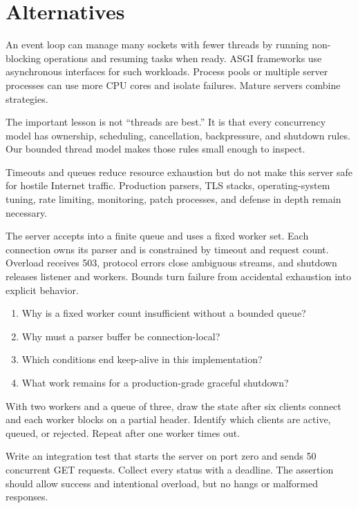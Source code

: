 \section{Alternatives}

An event loop can manage many sockets with fewer threads by running non-blocking
operations and resuming tasks when ready. ASGI frameworks use asynchronous
interfaces for such workloads. Process pools or multiple server processes can
use more CPU cores and isolate failures. Mature servers combine strategies.

The important lesson is not ``threads are best.'' It is that every concurrency
model has ownership, scheduling, cancellation, backpressure, and shutdown rules.
Our bounded thread model makes those rules small enough to inspect.

\begin{securityboundary}
Timeouts and queues reduce resource exhaustion but do not make this server safe
for hostile Internet traffic. Production parsers, TLS stacks, operating-system
tuning, rate limiting, monitoring, patch processes, and defense in depth remain
necessary.
\end{securityboundary}

\summarytitle

The server accepts into a finite queue and uses a fixed worker set. Each
connection owns its parser and is constrained by timeout and request count.
Overload receives 503, protocol errors close ambiguous streams, and shutdown
releases listener and workers. Bounds turn failure from accidental exhaustion
into explicit behavior.

\reviewtitle
\begin{enumerate}
  \item Why is a fixed worker count insufficient without a bounded queue?
  \item Why must a parser buffer be connection-local?
  \item Which conditions end keep-alive in this implementation?
  \item What work remains for a production-grade graceful shutdown?
\end{enumerate}

\begin{exercise}
With two workers and a queue of three, draw the state after six clients connect
and each worker blocks on a partial header. Identify which clients are active,
queued, or rejected. Repeat after one worker times out.
\end{exercise}

\begin{exercise}
Write an integration test that starts the server on port zero and sends 50
concurrent GET requests. Collect every status with a deadline. The assertion
should allow success and intentional overload, but no hangs or malformed
responses.
\end{exercise}


